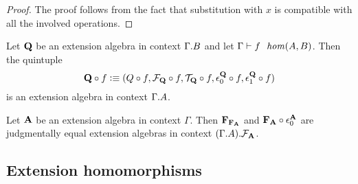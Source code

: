 \begin{proof}
The proof follows from the fact that substitution with $x$ is compatible with
all the involved operations.
\end{proof}

\begin{cor}
Let $\mathbf{Q}$ be an extension algebra in context $\ctxext{\Gamma}{B}$
and let $\jhom{\Gamma}{A}{B}{f}$. Then the quintuple
\begin{equation*}
\jcomp{A}{f}{\extalg{Q}}
  \defeq
  ( \jcomp{A}{f}{\cftalgc{\cftalg{Q}}},
    \jcomp{A}{f}{\cftalgf{\cftalg{Q}}},
    \jcomp{A}{f}{\cftalgt{\cftalg{Q}}},
    \jcomp{A}{f}{\cftctxext[\cftalg{Q}]},
    \jcomp{A}{f}{\cftfamext[\cftalg{Q}]})
\end{equation*}
is an extension algebra in context $\ctxext{\Gamma}{A}$.
\end{cor}

\begin{cor}
Let $\mathbf{A}$ be an extension algebra in context $\Gamma$. Then
$\mathbf{F_{F_A}}$ and $\jcomp{}{\cftctxext[\extalg{A}]}{\extalg{F_A}}$ are
judgmentally equal extension algebras in context $\ctxext{{\Gamma}{\cftalgc{\cftalg{A}}}}{\cftalgf{\cftalg{A}}}$.
\end{cor}

\subsection{Extension homomorphisms}

